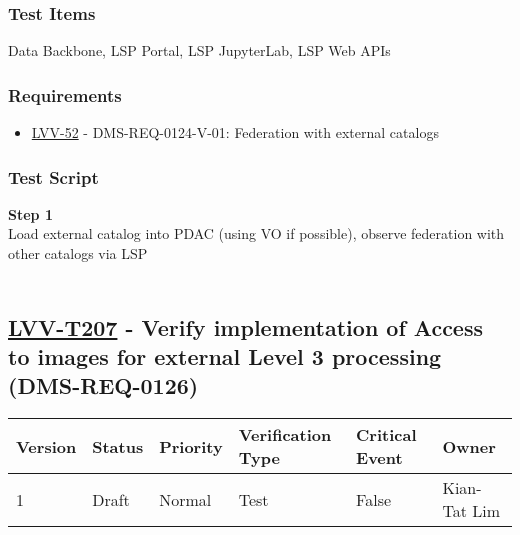 \hypertarget{test-items-182}{%
\subsubsection{Test Items}\label{test-items-182}}

Data Backbone, LSP Portal, LSP JupyterLab, LSP Web APIs

\hypertarget{requirements-183}{%
\subsubsection{Requirements}\label{requirements-183}}

\begin{itemize}
\tightlist
\item
  \href{https://jira.lsstcorp.org/browse/LVV-52}{LVV-52} -
  DMS-REQ-0124-V-01: Federation with external catalogs
\end{itemize}

\hypertarget{test-script-183}{%
\subsubsection{Test Script}\label{test-script-183}}

\textbf{Step 1}\\
Load external catalog into PDAC (using VO if possible), observe
federation with other catalogs via LSP\\
~\\

\hypertarget{lvv-t207---verify-implementation-of-access-to-images-for-external-level-3-processing-dms-req-0126}{%
\subsection{\texorpdfstring{\href{https://jira.lsstcorp.org/secure/Tests.jspa\#/testCase/LVV-T207}{LVV-T207}
- Verify implementation of Access to images for external Level 3
processing
(DMS-REQ-0126)}{LVV-T207 - Verify implementation of Access to images for external Level 3 processing (DMS-REQ-0126)}}\label{lvv-t207---verify-implementation-of-access-to-images-for-external-level-3-processing-dms-req-0126}}

\begin{longtable}[]{@{}llllll@{}}
\toprule
Version & Status & Priority & Verification Type & Critical Event &
Owner\tabularnewline
\midrule
\endhead
1 & Draft & Normal & Test & False & Kian-Tat Lim\tabularnewline
\bottomrule
\end{longtable}

